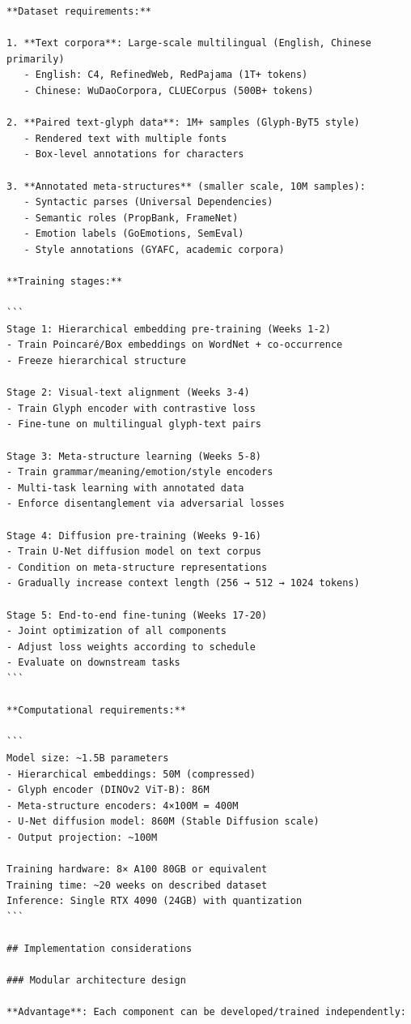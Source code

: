 \documentclass[11pt]{article}
\begin{document}
\begin{verbatim}
**Dataset requirements:**

1. **Text corpora**: Large-scale multilingual (English, Chinese primarily)
   - English: C4, RefinedWeb, RedPajama (1T+ tokens)
   - Chinese: WuDaoCorpora, CLUECorpus (500B+ tokens)

2. **Paired text-glyph data**: 1M+ samples (Glyph-ByT5 style)
   - Rendered text with multiple fonts
   - Box-level annotations for characters

3. **Annotated meta-structures** (smaller scale, 10M samples):
   - Syntactic parses (Universal Dependencies)
   - Semantic roles (PropBank, FrameNet)
   - Emotion labels (GoEmotions, SemEval)
   - Style annotations (GYAFC, academic corpora)

**Training stages:**

```
Stage 1: Hierarchical embedding pre-training (Weeks 1-2)
- Train Poincaré/Box embeddings on WordNet + co-occurrence
- Freeze hierarchical structure

Stage 2: Visual-text alignment (Weeks 3-4)  
- Train Glyph encoder with contrastive loss
- Fine-tune on multilingual glyph-text pairs

Stage 3: Meta-structure learning (Weeks 5-8)
- Train grammar/meaning/emotion/style encoders
- Multi-task learning with annotated data
- Enforce disentanglement via adversarial losses

Stage 4: Diffusion pre-training (Weeks 9-16)
- Train U-Net diffusion model on text corpus
- Condition on meta-structure representations
- Gradually increase context length (256 → 512 → 1024 tokens)

Stage 5: End-to-end fine-tuning (Weeks 17-20)
- Joint optimization of all components
- Adjust loss weights according to schedule
- Evaluate on downstream tasks
```

**Computational requirements:**

```
Model size: ~1.5B parameters
- Hierarchical embeddings: 50M (compressed)
- Glyph encoder (DINOv2 ViT-B): 86M
- Meta-structure encoders: 4×100M = 400M
- U-Net diffusion model: 860M (Stable Diffusion scale)
- Output projection: ~100M

Training hardware: 8× A100 80GB or equivalent
Training time: ~20 weeks on described dataset
Inference: Single RTX 4090 (24GB) with quantization
```

## Implementation considerations

### Modular architecture design

**Advantage**: Each component can be developed/trained independently:


\end{verbatim}
\end{document}
